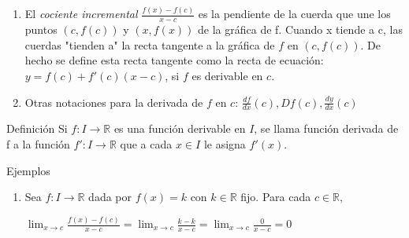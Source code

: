 \documentclass{beamer}
\newcounter{saveenumi}
\newcommand{\seti}{\setcounter{saveenumi}{\value{enumi}}}
\newcommand{\conti}{\setcounter{enumi}{\value{saveenumi}}}
\begin{document}
\begin{frame}

\begin{enumerate}
\conti
\item El \textit{cociente incremental} $\frac{f(x)-f(c)}{x-c}$ es la pendiente de la cuerda que une los puntos $\left(c,f(c)\right)$ y $\left(x, f(x)\right)$ de la gráfica de f. Cuando x tiende a c, las cuerdas "tienden a" la recta tangente a la gráfica de $f$ en $\left(c,f(c)\right)$.
De hecho se define esta recta tangente como la recta de ecuación: $y = f(c) + f'(c)(x-c)$, si $f$ es derivable en $c$.
\item Otras notaciones para la derivada de $f$ en $c$: $\frac{df}{dx}(c), Df(c),\frac{dy}{dx}(c)$
\end{enumerate}

\begin{block}{Definición}
Si $f:I\rightarrow\mathbb{R}$ es una función derivable en $I$, se llama función derivada de f a la función $f':I\rightarrow\mathbb{R}$ que a cada $x\in{I}$ le asigna $f'(x)$.
\end{block}

\begin{exampleblock}{Ejemplos}

\begin{enumerate}
\item Sea $f:I\rightarrow\mathbb{R}$ dada por $f(x) = k$ con $k\in{\mathbb{R}}$ fijo. Para cada $c\in{\mathbb{R}},$
\begin{center}
$\displaystyle\lim_{x \to c}\frac{f(x)-f(c)}{x-c} = \displaystyle\lim_{x \to c}\frac{k-k}{x-c} = \displaystyle\lim_{x \to c}\frac{0}{x-c} = 0$
\end{center}
\seti
\end{enumerate}
\end{exampleblock}

\end{frame}
\end{document}
